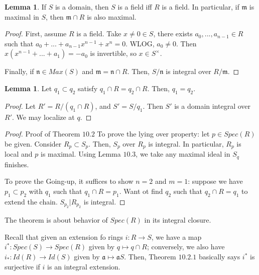 \documentclass{article}
\theoremstyle{definition}
\theoremstyle{definition}
\theoremstyle{definition}
\theoremstyle{definition}
\newtheorem{lemma}[theorem]{Lemma}
\theoremstyle{definition}
\theoremstyle{definition}
\theoremstyle{definition}
\begin{document}
\begin{tcolorbox}
\begin{lemma}
If $S$ is a domain, then $S$ is a field iff $R$ is a field. In particular, if $\mathfrak{m}$ is maximal in $S$, then $\mathfrak{m}\cap R$ is also maximal. 
\end{lemma}
\end{tcolorbox}
\begin{proof}
    First, assume $R$ is a field. Take $x\neq 0\in S$, there exists $a_0,...,a_{n-1}\in R$ such that $a_0+...+a_{n-1}x^{n-1}+x^n=0$. WLOG, $a_0\neq 0$. Then $x(x^{n-1}+...+a_{1})=-a_0$ is invertible, so $x\in S^{\times}$. 

    Finally, if $\mathfrak{n}\in Max(S)$ and $\mathfrak{m}=\mathfrak{n}\cap R$. Then, $S/\mathfrak{n}$ is integral over $R/\mathfrak{m}$. 
\end{proof}


\begin{tcolorbox}
\begin{lemma}
Let $q_1\subset q_2$ satisfy $q_1\cap R=q_2\cap R$. Then, $q_1=q_2$. 
\end{lemma}
\end{tcolorbox}
\begin{proof}
    Let $R'=R/(q_1\cap R)$, and $S'=S/q_1$. Then $S'$ is a domain integral over $R'$. We may localize at $q$. 
\end{proof}


\begin{proof}{Proof of Theorem $10.2$}
   To prove the lying over property: let $p\in Spec(R)$ be given. Consider $R_p\subset S_p$. Then, $S_p$ over $R_p$ is integral. In particular, $R_p$ is local and $p$ is maximal. Using Lemma $10.3$, we take any maximal ideal in $S_q$ finishes. 

   To prove the Going-up, it suffices to show $n=2$ and $m=1$: suppose we have $p_1\subset p_2$ with $q_1$ such that $q_1\cap R=p_1$. Want ot find $q_2$ such that $q_2\cap R=q_1$ to extend the chain. $S_{p_2}| R_{p_2}$ is integral. 
   
   
   

\end{proof}



The theorem is about behavior of $Spec(R)$ in its integral closure. 

Recall that given an extension fo rings $i: R\to S$, we have a map $i^*: Spec(S)\to Spec(R)$ given by $q\mapsto q\cap R$; conversely, we also  have $i_*: Id(R)\to Id(S)$ given by $\mathfrak{a}\mapsto \mathfrak{a}S$. Then, Theorem $10.2.1$ basically says $i^*$ is surjective if $i$
is an integral extension. 
\end{document}
